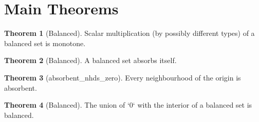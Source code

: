 \documentclass{article}
\theoremstyle{definition}
\newtheorem{theorem}{Theorem}
\begin{document}
\section{Main Theorems}
\begin{theorem}[Balanced]
Scalar multiplication (by possibly different types) of a balanced set is monotone.
\end{theorem}

\begin{theorem}[Balanced]
A balanced set absorbs itself.
\end{theorem}

\begin{theorem}[absorbent_nhds_zero]
Every neighbourhood of the origin is absorbent.
\end{theorem}

\begin{theorem}[Balanced]
The union of `{0}` with the interior of a balanced set is balanced.
\end{theorem}
\end{document}

